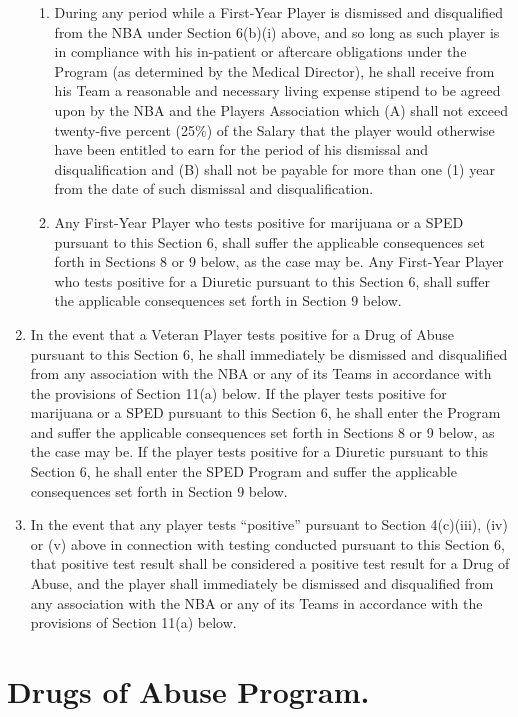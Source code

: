 \documentclass[
]{book}
\begin{document}
\begin{enumerate}
\begin{enumerate}
  \item
    During any period while a First-Year Player is dismissed and disqualified from the NBA under Section 6(b)(i) above, and so long as such player is in compliance with his in-patient or aftercare obligations under the Program (as determined by the Medical Director), he shall receive from his Team a reasonable and necessary living expense stipend to be agreed upon by the NBA and the Players Association which (A) shall not exceed twenty-five percent (25\%) of the Salary that the player would otherwise have been entitled to earn for the period of his dismissal and disqualification and (B) shall not be payable for more than one (1) year from the date of such dismissal and disqualification.
  \item
    Any First-Year Player who tests positive for marijuana or a SPED pursuant to this Section 6, shall suffer the applicable consequences set forth in Sections 8 or 9 below, as the case may be. Any First-Year Player who tests positive for a Diuretic pursuant to this Section 6, shall suffer the applicable consequences set forth in Section 9 below.
  \end{enumerate}
\item
  In the event that a Veteran Player tests positive for a Drug of Abuse pursuant to this Section 6, he shall immediately be dismissed and disqualified from any association with the NBA or any of its Teams in accordance with the provisions of Section 11(a) below. If the player tests positive for marijuana or a SPED pursuant to this Section 6, he shall enter the Program and suffer the applicable consequences set forth in Sections 8 or 9 below, as the case may be. If the player tests positive for a Diuretic pursuant to this Section 6, he shall enter the SPED Program and suffer the applicable consequences set forth in Section 9 below.
\item
  In the event that any player tests ``positive'' pursuant to Section 4(c)(iii), (iv) or (v) above in connection with testing conducted pursuant to this Section 6, that positive test result shall be considered a positive test result for a Drug of Abuse, and the player shall immediately be dismissed and disqualified from any association with the NBA or any of its Teams in accordance with the provisions of Section 11(a) below.
\end{enumerate}

\hypertarget{drugs-of-abuse-program.}{%
\section{Drugs of Abuse Program.}\label{drugs-of-abuse-program.}}
\end{document}
